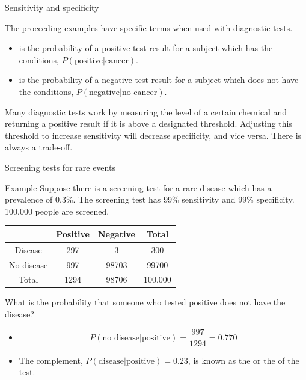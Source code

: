 \documentclass[xcolor=table]{beamer}
\begin{document}
\begin{frame}{Sensitivity and specificity}
\begin{block}{}
The proceeding examples have specific terms when used with diagnostic tests.
\begin{itemize}
\pause
\item {} is the probability of a positive test result for a subject which has the conditions, $P(\text{positive}|\text{cancer})$.
\pause
\item {} is the probability of a negative test result for a subject which does not have the conditions, $P(\text{negative}|\text{no cancer})$.
\end{itemize}

\pause
Many diagnostic tests work by measuring the level of a certain chemical and returning a positive result if it is above a designated threshold. Adjusting this threshold to increase sensitivity will decrease specificity, and vice versa. There is always a trade-off.
\end{block}
\end{frame}

\begin{frame}{Screening tests for rare events}
\begin{exampleblock}{Example}
Suppose there is a screening test for a rare disease which has a prevalence of 0.3\%. The screening test has 99\% sensitivity and 99\% specificity. 100,000 people are screened.\\
\smallskip
{\centering \renewcommand{\arraystretch}{1}
\begin{tabular}{c | c  c | c}
 & Positive & Negative & Total \\
\hline
Disease & 297 & 3 & 300\\
No disease & 997 & 98703 & 99700\\
\hline
Total & 1294 & 98706 & 100,000 
\end{tabular}\par
\renewcommand{\arraystretch}{1.5}
}
\smallskip
What is the probability that someone who tested positive does not have the disease?
\begin{itemize}
\pause
\item \[P(\text{no disease} | \text{positive}) = \frac {997}{1294} = 0.770\]
\vspace*{-\baselineskip}\pause
\item The complement, $P(\text{disease} | \text{positive}) = 0.23$, is known as the  or the  of the test.
\end{itemize}

\end{exampleblock}
\end{frame}
\end{document}
